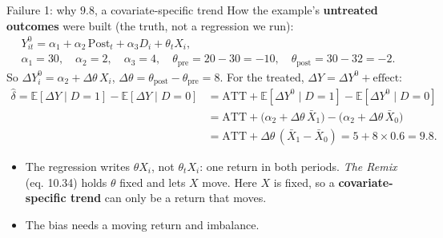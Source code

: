 \documentclass[
  11pt,
  ignorenonframetext,
  aspectratio=169,
]{beamer}
\providecommand{\tightlist}{%
  \setlength{\itemsep}{0pt}\setlength{\parskip}{0pt}}
\begin{document}
\begin{frame}{Failure 1: why \(9.8\), a covariate-specific trend}
\protect{}\label{failure-1-why-9.8-a-covariate-specific-trend}
How the example's \textbf{untreated outcomes} were built (the truth, not
a regression we run): \[
\begin{gathered}
Y^0_{it} = \alpha_1 + \alpha_2\,\text{Post}_t + \alpha_3 D_i + \theta_t X_i , \\
\alpha_1 = 30, \quad \alpha_2 = 2, \quad \alpha_3 = 4, \quad \theta_{\text{pre}} = 20 - 30 = -10, \quad \theta_{\text{post}} = 30 - 32 = -2 .
\end{gathered}
\] So \(\Delta Y^0_i = \alpha_2 + \Delta\theta\, X_i\),
\(\Delta\theta = \theta_{\text{post}} - \theta_{\text{pre}} = 8\). For
the treated, \(\Delta Y = \Delta Y^0 + \text{effect}\): \[
\begin{aligned}
\hat\delta = \mathbb{E}[\Delta Y \mid D=1] - \mathbb{E}[\Delta Y \mid D=0]
&= \text{ATT} + \mathbb{E}[\Delta Y^0 \mid D=1] - \mathbb{E}[\Delta Y^0 \mid D=0] \\
&= \text{ATT} + \big(\alpha_2 + \Delta\theta\, \bar X_1\big) - \big(\alpha_2 + \Delta\theta\, \bar X_0\big) \\
&= \text{ATT} + \Delta\theta\,(\bar X_1 - \bar X_0) = 5 + 8 \times 0.6 = 9.8 .
\end{aligned}
\]

\begin{itemize}
\tightlist
\item
  The regression writes \(\theta X_i\), not \(\theta_t X_i\): one return
  in both periods. \emph{The Remix} (eq. 10.34) holds \(\theta\) fixed
  and lets \(X\) move. Here \(X\) is fixed, so a
  \textbf{covariate-specific trend} can only be a return that moves.
\item
  The bias needs a moving return and imbalance.
\end{itemize}
\end{frame}
\end{document}

